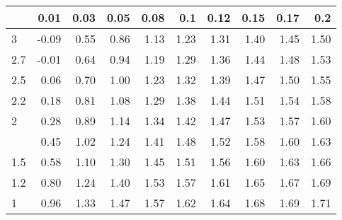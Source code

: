 
\begin{tabular}{lrrrrrrrrr}
\toprule
  & 0.01 & 0.03 & 0.05 & 0.08 & 0.1 & 0.12 & 0.15 & 0.17 & 0.2\\
\midrule
3 & -0.09 & 0.55 & 0.86 & 1.13 & 1.23 & 1.31 & 1.40 & 1.45 & 1.50\\
2.7 & -0.01 & 0.64 & 0.94 & 1.19 & 1.29 & 1.36 & 1.44 & 1.48 & 1.53\\
2.5 & 0.06 & 0.70 & 1.00 & 1.23 & 1.32 & 1.39 & 1.47 & 1.50 & 1.55\\
2.2 & 0.18 & 0.81 & 1.08 & 1.29 & 1.38 & 1.44 & 1.51 & 1.54 & 1.58\\
2 & 0.28 & 0.89 & 1.14 & 1.34 & 1.42 & 1.47 & 1.53 & 1.57 & 1.60\\
\addlinespace
1.7 & 0.45 & 1.02 & 1.24 & 1.41 & 1.48 & 1.52 & 1.58 & 1.60 & 1.63\\
1.5 & 0.58 & 1.10 & 1.30 & 1.45 & 1.51 & 1.56 & 1.60 & 1.63 & 1.66\\
1.2 & 0.80 & 1.24 & 1.40 & 1.53 & 1.57 & 1.61 & 1.65 & 1.67 & 1.69\\
1 & 0.96 & 1.33 & 1.47 & 1.57 & 1.62 & 1.64 & 1.68 & 1.69 & 1.71\\
\bottomrule
\end{tabular}
